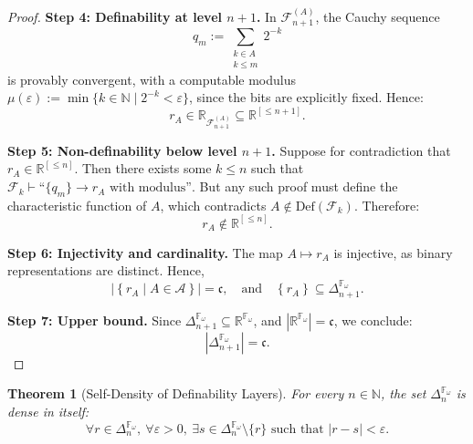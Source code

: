 \documentclass[12pt]{article}
\theoremstyle{definition}
\theoremstyle{plain}
\newtheorem{theorem}[definition]{Theorem}
\theoremstyle{remark}
\begin{document}
\begin{proof}
\textbf{Step 4: Definability at level \( n+1 \).}  
In \( \mathcal{F}_{n+1}^{(A)} \), the Cauchy sequence
\[
q_m := \sum_{\substack{k \in A \\ k \leq m}} 2^{-k}
\]
is provably convergent, with a computable modulus \( \mu(\varepsilon) := \min\{k \in \mathbb{N} \mid 2^{-k} < \varepsilon\} \), since the bits are explicitly fixed. Hence:
\[
r_A \in \mathbb{R}_{\mathcal{F}_{n+1}^{(A)}} \subseteq \mathbb{R}^{[\leq n+1]}.
\]

\textbf{Step 5: Non-definability below level \( n+1 \).}  
Suppose for contradiction that \( r_A \in \mathbb{R}^{[\leq n]} \). Then there exists some \( k \leq n \) such that \( \mathcal{F}_k \vdash \text{``}\{q_m\} \to r_A \text{ with modulus} \text{''} \). But any such proof must define the characteristic function of \( A \), which contradicts \( A \notin \mathrm{Def}(\mathcal{F}_k) \). Therefore:
\[
r_A \notin \mathbb{R}^{[\leq n]}.
\]

\textbf{Step 6: Injectivity and cardinality.}  
The map \( A \mapsto r_A \) is injective, as binary representations are distinct. Hence,
\[
\left| \left\{ r_A \mid A \in \mathcal{A} \right\} \right| = \mathfrak{c},
\quad \text{and} \quad
\left\{ r_A \right\} \subseteq \Delta_{n+1}^{\mathbb{F}_\omega}.
\]

\textbf{Step 7: Upper bound.}  
Since \( \Delta_{n+1}^{\mathbb{F}_\omega} \subseteq \mathbb{R}^{\mathbb{F}_\omega} \), and \( |\mathbb{R}^{\mathbb{F}_\omega}| = \mathfrak{c} \), we conclude:
\[
\left| \Delta_{n+1}^{\mathbb{F}_\omega} \right| = \mathfrak{c}.
\]
\end{proof}

\begin{theorem}[Self-Density of Definability Layers]
For every \( n \in \mathbb{N} \), the set \( \Delta_n^{\mathbb{F}_\omega} \) is dense in itself:
\[
\forall r \in \Delta_n^{\mathbb{F}_\omega},\ \forall \varepsilon > 0,\ \exists s \in \Delta_n^{\mathbb{F}_\omega}\setminus\{r\} \text{ such that } |r - s| < \varepsilon.
\]
\end{theorem}
\end{document}
